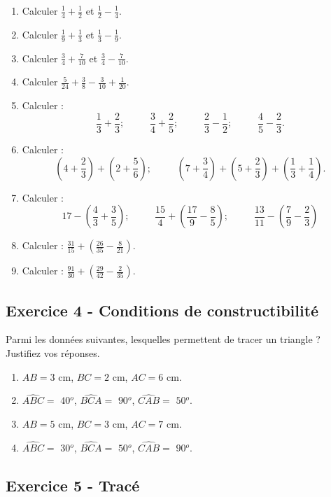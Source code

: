\documentclass[14pt]{extreport}
\newcommand\ang[1]{$#1{}^o$}
\theoremstyle{plain}
\begin{document}
\begin{enumerate}
\item Calculer $\frac14+\frac12$ et $\frac12-\frac14$.
\item Calculer $\frac19+\frac13$ et $\frac13-\frac19$.
\item Calculer $\frac34 + \frac7{10}$ et $\frac34-\frac7{10}$.
\item Calculer $\frac5{24}+\frac38 - \frac3{10} + \frac1{20}$. 
 \item Calculer : 
 \[\frac13 + \frac23;  \phantom{meow}
 \frac34+\frac25; \phantom{meow}
 \frac23-\frac12;  \phantom{meow}
 \frac45-\frac23.\]
 \item Calculer : \[\left(4+\frac23\right) + \left(2+ \frac56\right);  \phantom{meow}
 \left(7 + \frac34\right) + \left(5 + \frac23\right)
 + \left(\frac13+\frac14\right).\]
 \item Calculer :\[ 17 - \left(\frac43 + \frac35\right) ;  \phantom{meow}
 \frac{15}4 + \left(\frac{17}9-\frac85\right); 
  \phantom{meow}
  \frac{13}{11} - \left(\frac79 - \frac23\right)\]
  \item Calculer : $\frac{31}{15} + \left(\frac{26}{35} - \frac{8}{21}\right)$.
\item Calculer : $\frac{91}{30} + \left(\frac{29}{42} - \frac{2}{35}\right)$.
\end{enumerate}




\subsection*{Exercice 4 - Conditions de constructibilité}

Parmi les données suivantes, lesquelles permettent de tracer un triangle ? Justifiez vos réponses. 

\begin{enumerate}
\item $AB = 3$ cm, $BC = 2$ cm, $AC = 6$ cm. 
\item $\widehat{ABC} =$ \ang{40}, $\widehat{BCA} =$ \ang{90}, $\widehat{CAB} =$ \ang{50}.
\item $AB = 5$ cm, $BC = 3$ cm, $AC = 7$ cm.
\item $\widehat{ABC} =$ \ang{30}, $\widehat{BCA} =$ \ang{50}, $\widehat{CAB} =$ \ang{90}.
\end{enumerate}

\subsection*{Exercice 5 - Tracé}
\end{document}
